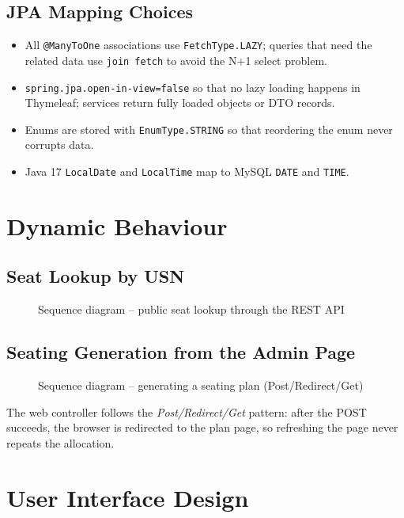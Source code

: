 \documentclass[11pt,a4paper]{article}
\begin{document}
\subsection{JPA Mapping Choices}
\begin{itemize}
  \item All \texttt{@ManyToOne} associations use \texttt{FetchType.LAZY}; queries that need the related data use \texttt{join fetch} to avoid the N+1 select problem.
  \item \texttt{spring.jpa.open-in-view=false} so that no lazy loading happens in Thymeleaf; services return fully loaded objects or DTO records.
  \item Enums are stored with \texttt{EnumType.STRING} so that reordering the enum never corrupts data.
  \item Java 17 \texttt{LocalDate} and \texttt{LocalTime} map to MySQL \texttt{DATE} and \texttt{TIME}.
\end{itemize}

\section{Dynamic Behaviour}
\subsection{Seat Lookup by USN}
\begin{figure}[H]\centering
\resizebox{\linewidth}{!}{}
\caption{Sequence diagram -- public seat lookup through the REST API}
\end{figure}

\subsection{Seating Generation from the Admin Page}
\begin{figure}[H]\centering
\resizebox{\linewidth}{!}{}
\caption{Sequence diagram -- generating a seating plan (Post/Redirect/Get)}
\end{figure}
The web controller follows the \emph{Post/Redirect/Get} pattern: after the POST succeeds, the browser is redirected to the plan page, so refreshing the page never repeats the allocation.

\section{User Interface Design}
\end{document}
